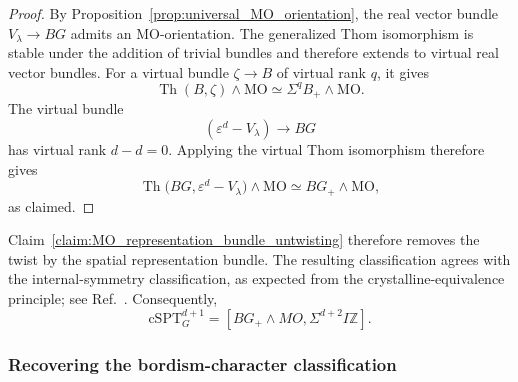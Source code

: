 \documentclass[aps,prx,reprint,superscriptaddress,twocolumn,amsmath,amssymb,amsfonts, nofootinbib]{revtex4-2}
\theoremstyle{apsstyle}
\begin{document}
\begin{proof}
By Proposition~\ref{prop:universal_MO_orientation}, the real vector
bundle $V_\lambda\to BG$ admits an $\mathrm{MO}$-orientation. The
generalized Thom isomorphism is stable under the addition of trivial
bundles and therefore extends to virtual real vector bundles. For a
virtual bundle $\zeta\to B$ of virtual rank $q$, it gives
\begin{equation*}
    \operatorname{Th}(B,\zeta)\wedge\mathrm{MO}
    \simeq
    \Sigma^qB_+\wedge\mathrm{MO}.
\end{equation*}
The virtual bundle
\begin{equation*}
    \left(\varepsilon^d-V_\lambda\right)
    \longrightarrow
    BG
\end{equation*}
has virtual rank $d-d=0$. Applying the virtual Thom isomorphism
therefore gives
\begin{equation*}
    \operatorname{Th}
    \bigl(BG,\varepsilon^d-V_\lambda\bigr)
    \wedge\mathrm{MO}
    \simeq
    BG_+\wedge\mathrm{MO},
\end{equation*}
as claimed.
\end{proof}

\noindent Claim~\ref{claim:MO_representation_bundle_untwisting} therefore removes
the twist by the spatial representation bundle. The resulting
classification agrees with the internal-symmetry classification, as
expected from the crystalline-equivalence principle; see
Ref.~\cite[Example~3.5]{FreedHopkins}. Consequently,
\begin{equation*}
    \text{cSPT}^{d+1}_{G} = [BG_{+}\wedge MO, \Sigma^{d+2}I\mathbb{Z}].
\end{equation*}

\subsubsection{Recovering the bordism-character classification}
\end{document}
